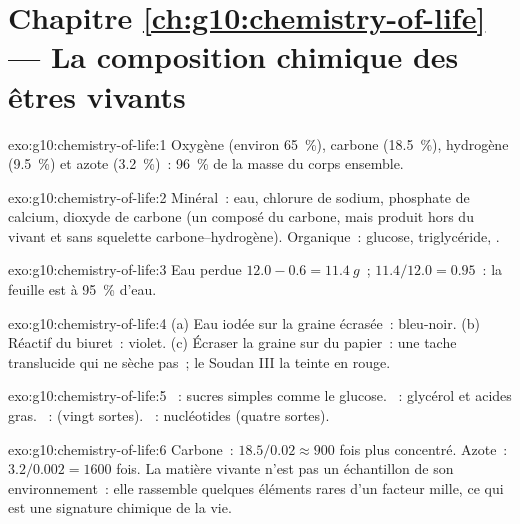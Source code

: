 \section*{Chapitre \ref{ch:g10:chemistry-of-life} --- La composition chimique des êtres vivants}

\begin{solution}{exo:g10:chemistry-of-life:1}
Oxygène (environ 65~\%), carbone (18.5~\%), hydrogène (9.5~\%) et azote
(3.2~\%)~: 96~\% de la masse du corps ensemble.
\end{solution}

\begin{solution}{exo:g10:chemistry-of-life:2}
Minéral~: eau, chlorure de sodium, phosphate de calcium, dioxyde de
carbone (un composé du carbone, mais produit hors du vivant et sans
squelette carbone--hydrogène). Organique~: glucose, triglycéride,
.
\end{solution}

\begin{solution}{exo:g10:chemistry-of-life:3}
Eau perdue $12.0 - 0.6 = \qty{11.4}{g}$~; $11.4/12.0 = 0.95$~: la
feuille est à 95~\% d'eau.
\end{solution}

\begin{solution}{exo:g10:chemistry-of-life:4}
(a) Eau iodée sur la graine écrasée~: bleu-noir. (b) Réactif du
biuret~: violet. (c) Écraser la graine sur du papier~: une tache
translucide qui ne sèche pas~; le Soudan III la teinte en rouge.
\end{solution}

\begin{solution}{exo:g10:chemistry-of-life:5}
~: sucres simples comme le glucose. ~: glycérol et
acides gras. ~:  (vingt sortes). ~: nucléotides (quatre sortes).
\end{solution}

\begin{solution}{exo:g10:chemistry-of-life:6}
Carbone~: $18.5/0.02 \approx 900$ fois plus concentré. Azote~:
$3.2/0.002 = 1600$ fois. La matière vivante n'est pas un échantillon de
son environnement~: elle rassemble quelques éléments rares d'un facteur
mille, ce qui est une signature chimique de la vie.
\end{solution}

